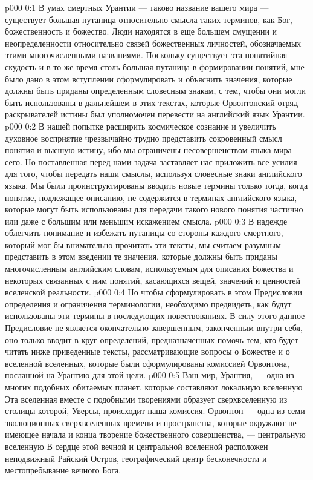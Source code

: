 \uforeword
\author{Божественный Советник}
\vs p000 0:1 В умах смертных Урантии --- таково название вашего мира --- существует большая путаница относительно смысла таких терминов, как Бог, божественность и божество. Люди находятся в еще большем смущении и неопределенности относительно связей божественных личностей, обозначаемых этими многочисленными названиями. Поскольку существует эта понятийная скудость и в то же время столь большая путаница в формировании понятий, мне было дано в этом вступлении сформулировать и объяснить значения, которые должны быть приданы определенным словесным знакам, с тем, чтобы они могли быть использованы в дальнейшем в этих текстах, которые Орвонтонский отряд раскрывателей истины был уполномочен перевести на английский язык Урантии.
\vs p000 0:2 В нашей попытке расширить космическое сознание и увеличить духовное восприятие чрезвычайно трудно представить сокровенный смысл понятия и высшую истину, ибо мы ограничены несовершенством языка мира сего. Но поставленная перед нами задача заставляет нас приложить все усилия для того, чтобы передать наши смыслы, используя словесные знаки английского языка. Мы были проинструктированы вводить новые термины только тогда, когда понятие, подлежащее описанию, не содержится в терминах английского языка, которые могут быть использованы для передачи такого нового понятия частично или даже с большим или меньшим искажением смысла.
\vs p000 0:3 В надежде облегчить понимание и избежать путаницы со стороны каждого смертного, который мог бы внимательно прочитать эти тексты, мы считаем разумным представить в этом введении те значения, которые должны быть приданы многочисленным английским словам, используемым для описания Божества и некоторых связанных с ним понятий, касающихся вещей, значений и ценностей вселенской реальности.
\vs p000 0:4 Но чтобы сформулировать в этом Предисловии определения и ограничения терминологии, необходимо предвидеть, как будут использованы эти термины в последующих повествованиях. В силу этого данное Предисловие не является окончательно завершенным, законченным внутри себя, оно только вводит в круг определений, предназначенных помочь тем, кто будет читать ниже приведенные тексты, рассматривающие вопросы о Божестве и о вселенной вселенных, которые были сформулированы комиссией Орвонтона, посланной на Урантию для этой цели.
\vs p000 0:5 \pc Ваш мир, Урантия, --- одна из многих подобных обитаемых планет, которые составляют локальную вселенную  Эта вселенная вместе с подобными творениями образует сверхвселенную  из столицы которой, Уверсы, происходит наша комиссия. Орвонтон --- одна из семи эволюционных сверхвселенных времени и пространства, которые окружают не имеющее начала и конца творение божественного совершенства, --- центральную вселенную  В сердце этой вечной и центральной вселенной расположен неподвижный Райский Остров, географический центр бесконечности и местопребывание вечного Бога.
